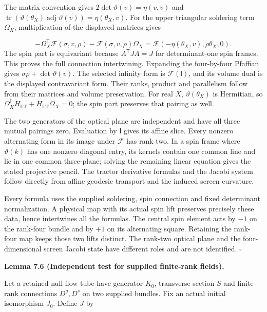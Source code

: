 \documentclass[
  english,
  11pt,
  reqno]{amsart}
\makeatletter
\newcommand{\pandocstatementheading}[1]{%
  \par\addpenalty{\@beginparpenalty}%
  \addvspace{.5\baselineskip plus .2\baselineskip minus .2\baselineskip}%
  {\normalfont\bfseries #1\par}%
  \nobreak\@afterindenttrue\@afterheading
}
\makeatother
\begin{document}
The matrix convention gives \(2\det\vartheta(v)=\eta(v,v)\) and
\(\operatorname{tr}(\vartheta(\theta_X)\operatorname{adj}\vartheta(v))=\eta(\theta_X,v)\).
For the upper triangular soldering term \(\Omega_X\), multiplication of
the displayed matrices gives

\label{eq:online-local-twistor-intertwining-check} \[
-\Omega_X^{\mathsf T}\mathcal F(\sigma,v,\rho)
-\mathcal F(\sigma,v,\rho)\Omega_X
=\mathcal F(-\eta(\theta_X,v),\rho\theta_X,0).
\] The spin part is equivariant because \(A^{\mathsf T}JA=J\) for
determinant-one spin frames. This proves the full connection
intertwining. Expanding the four-by-four Pfaffian gives
\(\sigma\rho+\det\vartheta(v)\). The selected infinity form is
\(\mathcal F(\mathsf I)\), and its volume dual is the displayed
contravariant form. Their ranks, product and parallelism follow from
their matrices and volume preservation. For real \(X\),
\(\vartheta(\theta_X)\) is Hermitian, so
\(\Omega_X^\dagger H_{\mathrm{LT}}+H_{\mathrm{LT}}\Omega_X=0\); the spin
part preserves that pairing as well.

The two generators of the optical plane are independent and have all
three mutual pairings zero. Evaluation by \(\mathsf I\) gives its affine
slice. Every nonzero alternating form in its image under \(\mathcal F\)
has rank two. In a spin frame where \(\vartheta(k)\) has one nonzero
diagonal entry, its kernels contain one common line and lie in one
common three-plane; solving the remaining linear equation gives the
stated projective pencil. The tractor derivative formulas and the Jacobi
system follow directly from affine geodesic transport and the induced
screen curvature.

Every formula uses the supplied soldering, spin connection and fixed
determinant normalization. A physical map with its actual spin lift
preserves precisely these data, hence intertwines all the formulas. The
central spin element acts by \(-1\) on the rank-four bundle and by
\(+1\) on its alternating square. Retaining the rank-four map keeps
those two lifts distinct. The rank-two optical plane and the
four-dimensional screen Jacobi state have different roles and are not
identified. \hfill\(\square\)

\pandocstatementheading{\leavevmode{}\label{lem:online-initialized-finite-rank-test}Lemma 7.6 (Independent test for supplied finite-rank fields).}

Let a retained null flow tube have generator \(K_0\), transverse section
\(S\) and finite-rank connections \(D^g,D^s\) on two supplied bundles.
Fix an actual initial isomorphism \(J_0\). Define \(J\) by
\end{document}
